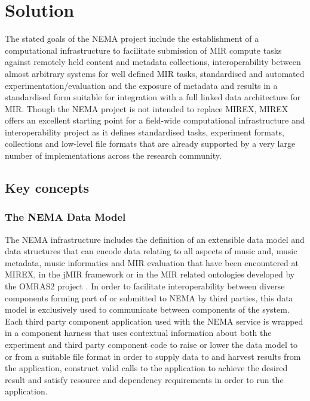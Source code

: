 \documentclass[conference]{IEEEtran}
\begin{document}
\section{Solution}
The stated goals of the NEMA project include the establishment of a computational infrastructure to facilitate submission of MIR compute tasks against remotely held content and metadata collections, interoperability between almost arbitrary systems for well defined MIR tasks, standardised and automated experimentation/evaluation and the exposure of metadata and results in a standardised form suitable for integration with a full linked data architecture for MIR. 
Though the NEMA project is not intended to replace MIREX, MIREX offers an excellent starting point for a field-wide computational infrastructure and interoperability project as it defines standardised tasks, experiment formats, collections and low-level file formats that are already supported by a very large number of implementations across the research community. 

\subsection{Key concepts}
\subsubsection{The NEMA Data Model}
The NEMA infrastructure includes the definition of an extensible data model and data structures that can encode data relating to all aspects of music and, music metadata, music informatics and MIR evaluation that have been encountered at MIREX, in the jMIR framework \cite{mckay2009jmir} or in the MIR related ontologies developed by the OMRAS2 project \cite{raimond2007music}. In order to facilitate interoperability between diverse components forming part of or submitted to NEMA by third parties, this data model is exclusively used to communicate between components of the system. 
Each third party component application used with the NEMA service is wrapped in a component harness that uses contextual information about both the experiment and third party component code to raise or lower the data model to or from a suitable file format in order to supply data to and harvest results from the application, construct valid calls to the application to achieve the desired result and satisfy resource and dependency requirements in order to run the application.  
\end{document}
